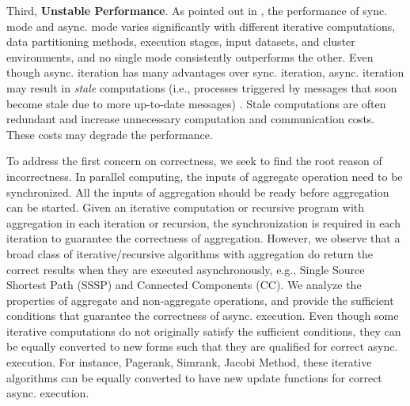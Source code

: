 Third, \textbf{Unstable Performance}. As pointed out in \cite{Xie2015SYNC}, the performance of sync. mode and async. mode varies significantly with different iterative computations, data partitioning methods, execution stages, input datasets, and cluster environments, and no single mode consistently outperforms the other. Even though async. iteration has many advantages over sync. iteration, async. iteration may result in \emph{stale} computations (i.e., processes triggered by messages that soon become stale due to more up-to-date messages) \cite{Fan2018Adaptive}. Stale computations are often redundant and increase unnecessary computation and communication costs. These costs may degrade the performance.




To address the first concern on correctness, we seek to find the root reason of incorrectness. In parallel computing, the inputs of aggregate operation need to be synchronized. All the inputs of aggregation should be ready before aggregation can be started. Given an iterative computation or recursive program with aggregation in each iteration or recursion, the synchronization is required in each iteration to guarantee the correctness of aggregation. However, we observe that a broad class of iterative/recursive algorithms with aggregation do return the correct results when they are executed asynchronously, e.g., Single Source Shortest Path (SSSP) and Connected Components (CC). We analyze the properties of aggregate and non-aggregate operations, and provide the sufficient conditions that guarantee the correctness of async. execution. Even though some iterative computations do not originally satisfy the sufficient conditions, they can be equally converted to new forms such that they are qualified for correct async. execution. For instance, Pagerank, Simrank, Jacobi Method, these iterative algorithms can be equally converted to have new update functions for correct async. execution.


